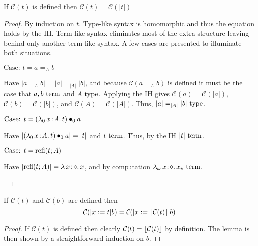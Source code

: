 \begin{lemma}
    \label{lem:2:classify_erase}
    If $\mathcal{C}(t)$ is defined then $\mathcal{C}(t) = \mathcal{C}(|t|)$
\end{lemma}
\begin{proof}
    By induction on $t$.
    Type-like syntax is homomorphic and thus the equation holds by the IH.
    Term-like syntax eliminates most of the extra structure leaving behind only another term-like syntax.
    A few cases are presented to illuminate both situations.

    $\text{Case: }t = a =_A b$
    \begin{proofcase}
        Have $|a =_A b| = |a| =_{|A|} |b|$, and because $\mathcal{C}(a =_A b)$ is defined it must be the case that $a, b~\textnormal{term}$ and $A~\textnormal{type}$.
        Applying the IH gives $\mathcal{C}(a) = \mathcal{C}(|a|)$, $\mathcal{C}(b) = \mathcal{C}(|b|)$, and $\mathcal{C}(A) = \mathcal{C}(|A|)$.
        Thus, $|a| =_{|A|} |b|~\textnormal{type}$.
    \end{proofcase}

    $\text{Case: }t = ({\lambda_0}\, x\! : \! A.\, t) \bullet_{0} a$
    \begin{proofcase}
        Have $|({\lambda_0}\, x\! : \! A.\, t) \bullet_{0} a| = |t|$ and $t~\textnormal{term}$.
        Thus, by the IH $|t|~\textnormal{term}$.
    \end{proofcase}
    
    $\text{Case: }t = \textnormal{refl}(t; A)$
    \begin{proofcase}
        Have $|\textnormal{refl}(t; A)| = {\lambda}\, x\! : \! \diamond.\, x$, and by computation ${\lambda_\omega}\, x\! : \! \diamond.\, x_\star~\textnormal{term}$.
    \end{proofcase}
\end{proof}

\begin{lemma}
    \label{lem:2:classify_subst}
    If $\mathcal{C}(t)$ and $\mathcal{C}(b)$ are defined then $$\mathcal{C}([x := t]b) = \mathcal{C}([x := \lfloor \mathcal{C}(t) \rfloor]b)$$
\end{lemma}
\begin{proof}
    If $\mathcal{C}(t)$ is defined then clearly $\mathcal{C}(t) = \lfloor \mathcal{C}(t) \rfloor$ by definition.
    The lemma is then shown by a straightforward induction on $b$.
\end{proof}

